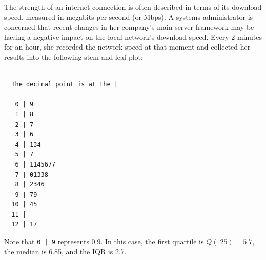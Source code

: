 \documentclass{examsetup}\usepackage[]{graphicx}\usepackage[]{color}
\makeatletter
\newenvironment{kframe}{%
 \def\at@end@of@kframe{}%
 \ifinner\ifhmode%
  \def\at@end@of@kframe{\end{minipage}}%
  \begin{minipage}{\columnwidth}%
 \fi\fi%
 \def\FrameCommand##1{\hskip\@totalleftmargin \hskip-\fboxsep
 \colorbox{shadecolor}{##1}\hskip-\fboxsep
     \hskip-\linewidth \hskip-\@totalleftmargin \hskip\columnwidth}%
 \MakeFramed {\advance\hsize-\width
   \@totalleftmargin\z@ \linewidth\hsize
   \@setminipage}}%
 {\par\unskip\endMakeFramed%
 \at@end@of@kframe}
\newenvironment{knitrout}{}{} %
\makeatother
\begin{document}
\begin{questions}
The strength of an internet connection is often described in terms of its download speed, measured in megabits per second (or Mbps).
A systems administrator is concerned that recent changes in her company's main server framework may be having a negative impact on the local network's download speed.
Every 2 minutes for an hour, she recorded the network speed at that moment and collected her results into the following stem-and-leaf plot:

\begin{knitrout}
\color{fgcolor}\begin{kframe}
\begin{verbatim}

  The decimal point is at the |

   0 | 9
   1 | 8
   2 | 7
   3 | 6
   4 | 134
   5 | 7
   6 | 1145677
   7 | 01338
   8 | 2346
   9 | 79
  10 | 45
  11 | 
  12 | 17
\end{verbatim}
\end{kframe}
\end{knitrout}

Note that \verb!0 | 9! represents 0.9. In this case, the first quartile is $Q(.25) = 5.7$, the median is 6.85, and the IQR is 2.7.



\end{questions}
\end{document}
